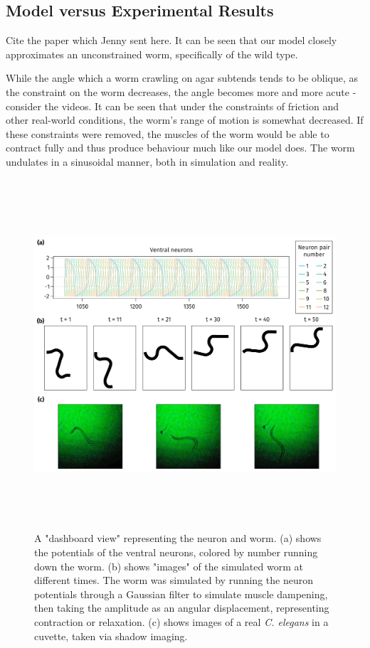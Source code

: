 \documentclass[
    11pt,
]{article}
\begin{document}

\subsection{Model versus Experimental Results}

Cite the paper which Jenny sent here.  It can be seen that our model closely approximates an unconstrained worm, specifically of the wild type.

While the angle which a worm crawling on agar subtends tends to be oblique, as the constraint on the worm decreases, the angle becomes more and more acute - consider the videos.  It can be seen that under the constraints of friction and other real-world conditions, the worm's range of motion is somewhat decreased.  If these constraints were removed, the muscles of the worm would be able to contract fully and thus produce behaviour much like our model does.  The worm undulates in a sinusoidal manner, both in simulation and reality.

\begin{figure}[h!]
    \centering
    \includegraphics[height=13cm]{figures/worm_neuron_dash/worm_neuron_dash.pdf}
    \caption{A "dashboard view" representing the neuron and worm.  (a) shows the potentials of the ventral neurons, colored by number running down the worm.  (b) shows "images" of the simulated worm at different times. The worm was simulated by running the neuron potentials through a Gaussian filter to simulate muscle dampening, then taking the amplitude as an angular displacement, representing contraction or relaxation.  (c) shows images of a real \emph{C. elegans} in a cuvette, taken via shadow imaging.}
    \label{fig: worm_neuron_dash}
\end{figure}
\end{document}
